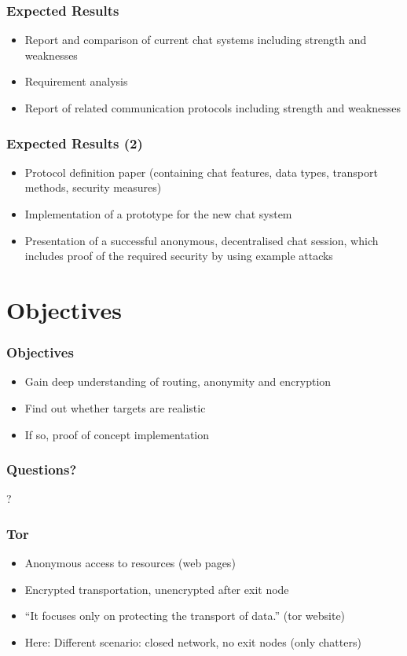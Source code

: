 \documentclass{beamer}
\begin{document}
\frame
{
  \frametitle{Expected Results}
  \begin{itemize}
    \item Report and comparison of current chat systems including strength and weaknesses
    \item Requirement analysis
    \item Report of related communication protocols including strength and weaknesses
  \end{itemize}
}
\frame
{
  \frametitle{Expected Results (2)}
  \begin{itemize}
     \item Protocol definition paper (containing chat features,
        data types, transport methods, security measures)
    \item Implementation of a prototype for the new chat system
    \item Presentation of a successful anonymous, decentralised chat session, which
       includes proof of the required security by using example attacks
  \end{itemize}
}

\section{Objectives}
\frame
{
  \frametitle{Objectives}
  \begin{itemize}
    \item Gain deep understanding of routing, anonymity and encryption
    \item Find out whether targets are realistic
    \item If so, \pause proof of concept implementation
  \end{itemize}
}

\frame
{
  \frametitle{Questions?}
  \begin{center}
  ?
  \end{center}
}

\frame
{
  \frametitle{Tor}
  \begin{itemize}
    \item Anonymous access to resources (web pages)
    \item Encrypted transportation, unencrypted after exit node
    \item "`It focuses only on protecting the transport of data."' (tor website)
    \item Here: Different scenario: closed network, no exit nodes (only chatters)
  \end{itemize}
}
\end{document}
